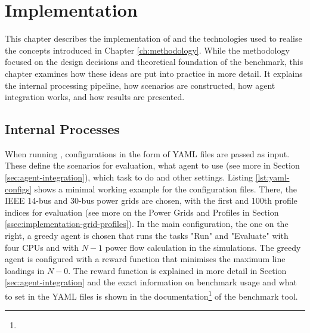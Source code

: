 \chapter{Implementation}\label{ch:implementation}
This chapter describes the implementation of \benchmark and the technologies used to realise the concepts introduced in Chapter \ref{ch:methodology}. While the methodology focused on the design decisions and theoretical foundation of the benchmark, this chapter examines how these ideas are put into practice in more detail. It explains the internal processing pipeline, how scenarios are constructed, how agent integration works, and how results are presented.



\section{Internal Processes}\label{sec:int-processes}
When running \benchmark, configurations in the form of YAML files are passed as input. These define the scenarios for evaluation, what agent to use (see more in Section \ref{sec:agent-integration}), which task to do and other settings. Listing \ref{lst:yaml-configs} shows a minimal working example for the configuration files. There, the IEEE 14-bus and 30-bus power grids are chosen, with the first and 100th profile indices for evaluation (see more on the Power Grids and Profiles in Section \ref{ssec:implementation-grid-profiles}). In the main configuration, the one on the right, a greedy agent is chosen that runs the tasks "Run" and "Evaluate" with four CPUs and with $N-1$ power flow calculation in the simulations. The greedy agent is configured with a reward function that minimises the maximum line loadings in $N-0$. The reward function is explained in more detail in Section \ref{sec:agent-integration} and the exact information on benchmark usage and what to set in the YAML files is shown in the documentation\footnote{\documentation} of the benchmark tool.

